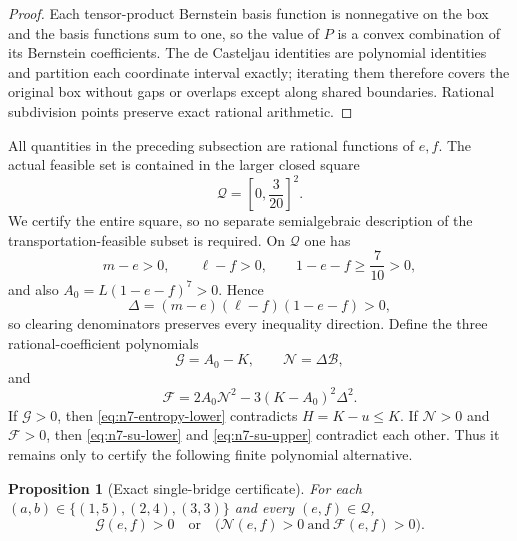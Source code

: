 \documentclass[11pt,a4paper]{article}
\numberwithin{equation}{section}
\newtheorem{proposition}[theorem]{Proposition}
\theoremstyle{definition}
\newcommand{\1}{\mathbf{1}}
\begin{document}
\begin{proof}
Each tensor-product Bernstein basis function is nonnegative on the box and
the basis functions sum to one, so the value of $P$ is a convex combination
of its Bernstein coefficients.  The de Casteljau identities are polynomial
identities and partition each coordinate interval exactly; iterating them
therefore covers the original box without gaps or overlaps except along
shared boundaries.  Rational subdivision points preserve exact rational
arithmetic.
\end{proof}

All quantities in the preceding subsection are rational functions of $e,f$.
The actual feasible set is contained in the larger closed square
\[
 \mathcal Q=\left[0,\frac3{20}\right]^2.
\]
We certify the entire square, so no separate semialgebraic description of
the transportation-feasible subset is required.  On $\mathcal Q$ one has
\[
 m-e>0,\qquad \ell-f>0,\qquad1-e-f\ge\frac7{10}>0,
\]
and also $A_0=L(1-e-f)^7>0$.  Hence
\[
 \Delta=(m-e)(\ell-f)(1-e-f)>0,
\]
so clearing denominators preserves every inequality direction.  Define the
three rational-coefficient polynomials
\[
 \mathcal G=A_0-K,
 \qquad
 \mathcal N=\Delta\mathcal B,
\]
and
\begin{equation}\label{eq:n7-GNF}
 \mathcal F=2A_0\mathcal N^2
 -3(K-A_0)^2\Delta^2.
\end{equation}
If $\mathcal G>0$, then \eqref{eq:n7-entropy-lower} contradicts
$H=K-u\le K$.  If $\mathcal N>0$ and $\mathcal F>0$, then
\eqref{eq:n7-su-lower} and \eqref{eq:n7-su-upper} contradict each other.
Thus it remains only to certify the following finite polynomial alternative.

\begin{proposition}[Exact single-bridge certificate]\label{prop:n7-bernstein}
For each $(a,b)\in\{(1,5),(2,4),(3,3)\}$ and every $(e,f)\in\mathcal Q$,
\begin{equation}\label{eq:n7-polynomial-alternative}
 \mathcal G(e,f)>0
 \quad\text{or}\quad
 \bigl(\mathcal N(e,f)>0\ \text{and}\ \mathcal F(e,f)>0\bigr).
\end{equation}
\end{proposition}
\end{document}
